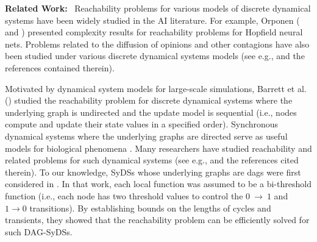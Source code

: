 \smallskip

\noindent
\textbf{Related Work:}~ Reachability problems for various
models of discrete dynamical systems have been widely studied
in the AI literature.
For example, Orponen 
(\citeyear{Orponen-1993} and \citeyear{Orponen-1994}) presented
complexity results for  reachability problems for Hopfield neural nets.
Problems related to the diffusion of opinions and other contagions have
also been studied under various discrete dynamical systems
models (see e.g., \cite{Auletta-etal-2018,Botan-etal-2019,Chistikov-etal-2020}
and the references contained therein).

Motivated by dynamical system models for large-scale simulations,
Barrett et al. (\citeyear{BH+06}) studied the reachability problem
for discrete dynamical systems where the underlying graph is 
undirected and the update model is sequential (i.e., nodes compute 
and update their state values in a specified order). 
Synchronous dynamical systems where the underlying graphs
are directed serve as useful models for biological
phenomena \cite{Kauffman-etal-2003}.
Many researchers have studied reachability and related 
problems for such dynamical systems (see e.g., 
\cite{OU-2020,OU-2017,Akutsu-etal-2007} and
the references cited therein).
To our knowledge, SyDSs whose underlying graphs are dags
were first considered in \cite{KKM+2013}. 
In that work, each local function was assumed to be
a bi-threshold function (i.e., each node has two threshold
values to control the $0 ~\rightarrow~  1$ and $1 \rightarrow 0$
transitions).
By establishing bounds on the lengths of cycles and transients,
they showed that the reachability problem can be efficiently
solved for such DAG-SyDSs.

